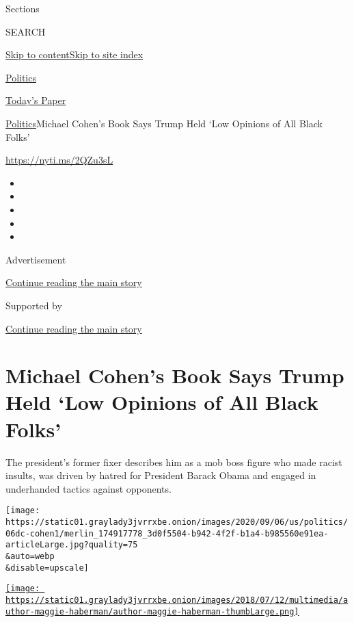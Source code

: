 Sections

SEARCH

\protect\hyperlink{site-content}{Skip to
content}\protect\hyperlink{site-index}{Skip to site index}

\href{https://www.nytimes3xbfgragh.onion/section/politics}{Politics}

\href{https://myaccount.nytimes3xbfgragh.onion/auth/login?response_type=cookie\&client_id=vi}{}

\href{https://www.nytimes3xbfgragh.onion/section/todayspaper}{Today's
Paper}

\href{/section/politics}{Politics}\textbar{}Michael Cohen's Book Says
Trump Held `Low Opinions of All Black Folks'

\url{https://nyti.ms/2QZu3sL}

\begin{itemize}
\item
\item
\item
\item
\item
\end{itemize}

Advertisement

\protect\hyperlink{after-top}{Continue reading the main story}

Supported by

\protect\hyperlink{after-sponsor}{Continue reading the main story}

\hypertarget{michael-cohens-book-says-trump-held-low-opinions-of-all-black-folks}{%
\section{Michael Cohen's Book Says Trump Held `Low Opinions of All Black
Folks'}\label{michael-cohens-book-says-trump-held-low-opinions-of-all-black-folks}}

The president's former fixer describes him as a mob boss figure who made
racist insults, was driven by hatred for President Barack Obama and
engaged in underhanded tactics against opponents.

\texttt{[image: https://static01.graylady3jvrrxbe.onion/images/2020/09/06/us/politics/06dc-cohen1/merlin\_174917778\_3d0f5504-b942-4f2f-b1a4-b985560e91ea-articleLarge.jpg?quality=75\\\&auto=webp\\\&disable=upscale]}

\href{https://www.nytimes3xbfgragh.onion/by/maggie-haberman}{\texttt{[image: https://static01.graylady3jvrrxbe.onion/images/2018/07/12/multimedia/author-maggie-haberman/author-maggie-haberman-thumbLarge.png]}}

